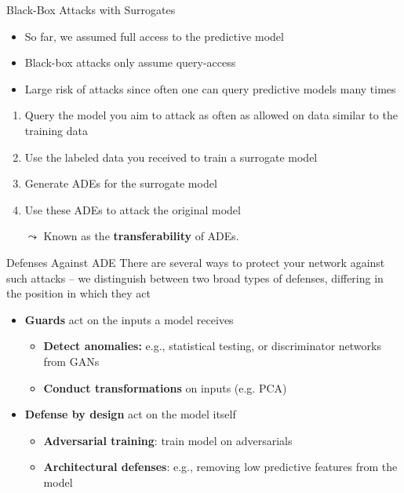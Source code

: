 \documentclass[10pt,compress,t,notes=noshow, xcolor=table]{beamer}
\begin{document}
\begin{vbframe}[c]{Black-Box Attacks with Surrogates }

\begin{itemize}
    \item So far, we assumed full access to the predictive model
    \item Black-box attacks only assume query-access
    \item Large risk of attacks since often one can query predictive models many times
\end{itemize}

\medskip
\begin{enumerate}
    \item Query the model you aim to attack as often as allowed on data similar to the training data
    \item Use the labeled data you received to train a surrogate model
    \item Generate ADEs for the surrogate model
    \item Use these ADEs to attack the original model
\end{enumerate}

\medskip
\begin{itemize}
    \item[$\leadsto$] Known as the \textbf{transferability} of ADEs.
\end{itemize}



\end{vbframe}

\begin{vbframe}[c]{Defenses Against ADE}
There are several ways to protect your network against such attacks -- we distinguish between two broad types of defenses, differing in the position in which they act
\begin{itemize}
    \item \textbf{Guards} act on the inputs a model receives
    \begin{itemize}
        \item \textbf{Detect anomalies:} e.g., statistical testing, or discriminator networks from GANs
        \item \textbf{Conduct transformations} on inputs (e.g. PCA)
    \end{itemize}
    \item \textbf{Defense by design} act on the model itself
    \begin{itemize}
        \item \textbf{Adversarial training}: train model on adversarials
        \item \textbf{Architectural defenses}: e.g., removing low predictive features from the model
    \end{itemize}
\end{itemize}
\end{vbframe}
\end{document}
